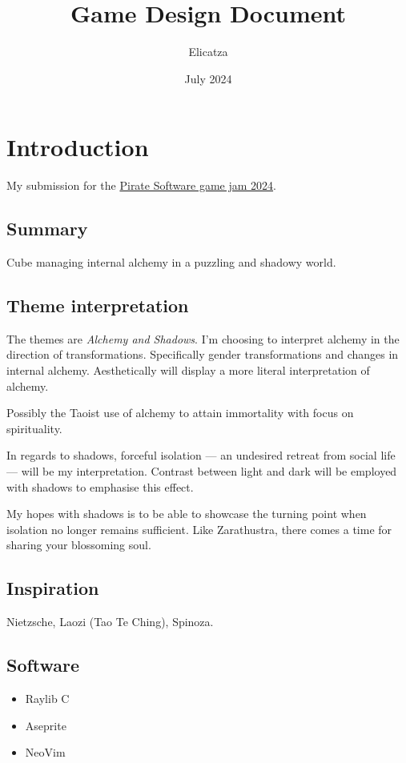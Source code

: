 \documentclass[12pt, letterpaper]{article}
\title{\textbf{Game Design Document}}
\author{Elicatza}
\date{July 2024}
\begin{document}
\maketitle
\tableofcontents
\section{Introduction}

My submission for the 
\href{https://itch.io/jam/pirate}{Pirate Software game jam 2024}.

\subsection{Summary}
Cube managing internal alchemy in a puzzling and shadowy world.

\subsection{Theme interpretation}

The themes are \textit{Alchemy and Shadows}. I'm choosing to interpret alchemy
in the direction of transformations. Specifically gender transformations and
changes in internal alchemy. Aesthetically will display a more literal
interpretation of alchemy.

Possibly the Taoist use of alchemy to attain immortality with focus on
spirituality.

In regards to shadows, forceful isolation --- an undesired retreat from social
life --- will be my interpretation. Contrast between light and dark will
be employed with shadows to emphasise this effect.

My hopes with shadows is to be able to showcase the turning point
when isolation no longer remains sufficient. Like Zarathustra, there
comes a time for sharing your blossoming soul.

\subsection{Inspiration}

Nietzsche, Laozi (Tao Te Ching), Spinoza.

\subsection{Software}
\begin{itemize}[itemsep=1pt]
    \item Raylib C
    \item Aseprite
    \item NeoVim
\end{itemize}
\end{document}
